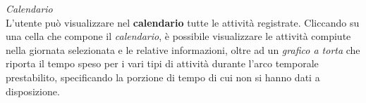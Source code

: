 \documentclass{article}
\begin{document}
    \begin{center}
        \begin{figure}[H]
            \centering
        \end{figure}
    \end{center}
    \textit{Calendario} \vspace*{7pt}\\
    L'utente può visualizzare nel \textbf{calendario} tutte le attività registrate. Cliccando su una cella che compone il \textit{calendario}, è possibile visualizzare le attività compiute nella giornata selezionata e le relative informazioni, oltre ad un \textit{grafico a torta} che riporta il tempo speso per i vari tipi di attività durante l'arco temporale prestabilito, specificando la porzione di tempo di cui non si hanno dati a disposizione.
\end{document}
